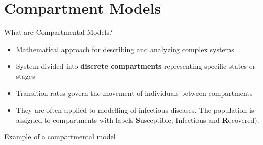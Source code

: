\section{Compartment Models}
\begin{frame}{What are Compartmental Models?}
  \begin{itemize}
    \item Mathematical approach for describing and analyzing complex systems
    \item System divided into \textbf{discrete compartments} representing specific states or stages
    \item Transition rates govern the movement of individuals between compartments
    \item They are often applied to modelling of infectious diseases. The population is assigned to compartments with labels \textbf{S}usceptible, \textbf{I}nfectious and \textbf{R}ecovered).
  \end{itemize}
\pause
\vfill
Example of a compartmental model
\begin{center}
    

\end{center}

\end{frame}

